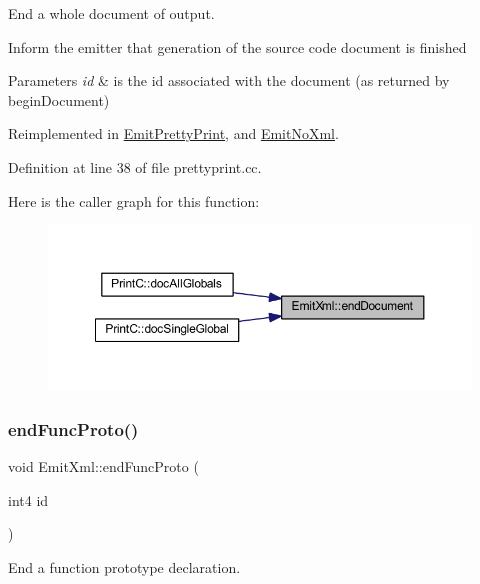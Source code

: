 End a whole document of output. 

Inform the emitter that generation of the source code document is finished 
\begin{DoxyParams}{Parameters}
{\em id} & is the id associated with the document (as returned by begin\+Document) \\
\hline
\end{DoxyParams}


Reimplemented in \mbox{\hyperlink{class_emit_pretty_print_aca37d689adabda9dd84cc333c87cabd8}{Emit\+Pretty\+Print}}, and \mbox{\hyperlink{class_emit_no_xml_a453ae349735a6e890eb8ccf3bce4a965}{Emit\+No\+Xml}}.



Definition at line 38 of file prettyprint.\+cc.

Here is the caller graph for this function\+:
\nopagebreak
\begin{figure}[H]
\begin{center}
\leavevmode
\includegraphics[width=350pt]{class_emit_xml_a8f2e7a4f2cd9fee90bed1eb966414424_icgraph}
\end{center}
\end{figure}
\mbox{\label{class_emit_xml_a0c1fad40b58e0a977f69ed80fb6f3bc8}} 
\subsubsection{\texorpdfstring{endFuncProto()}{endFuncProto()}}
{\footnotesize\ttfamily void Emit\+Xml\+::end\+Func\+Proto (\begin{DoxyParamCaption}\item[{int4}]{id }\end{DoxyParamCaption})\hspace{0.3cm}{\ttfamily [virtual]}}



End a function prototype declaration. 

